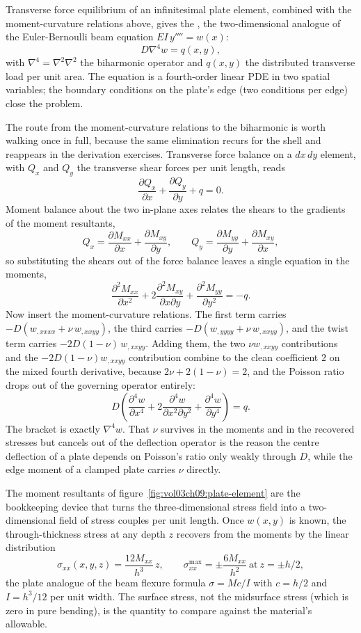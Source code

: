 Transverse force equilibrium of an infinitesimal plate element,
combined with the moment-curvature relations above, gives the
, the two-dimensional analogue of
the Euler-Bernoulli beam equation $EI \,y'''' = w(x)$:
\[
D \nabla^4 w = q(x, y),
\]
with $\nabla^4 = \nabla^2 \nabla^2$ the biharmonic operator and
$q(x, y)$ the distributed transverse load per unit area. The
equation is a fourth-order linear PDE in two spatial variables; the
boundary conditions on the plate's edge (two conditions per edge)
close the problem.

The route from the moment-curvature relations to the biharmonic is
worth walking once in full, because the same elimination recurs for the
shell and reappears in the derivation exercises. Transverse force
balance on a $dx\,dy$ element, with $Q_x$ and $Q_y$ the transverse
shear forces per unit length, reads
\[
\frac{\partial Q_x}{\partial x} + \frac{\partial Q_y}{\partial y}
+ q = 0 .
\]
Moment balance about the two in-plane axes relates the shears to the
gradients of the moment resultants,
\[
Q_x = \frac{\partial M_{xx}}{\partial x}
+ \frac{\partial M_{xy}}{\partial y}, \qquad
Q_y = \frac{\partial M_{yy}}{\partial y}
+ \frac{\partial M_{xy}}{\partial x},
\]
so substituting the shears out of the force balance leaves a single
equation in the moments,
\[
\frac{\partial^2 M_{xx}}{\partial x^2}
+ 2\frac{\partial^2 M_{xy}}{\partial x \partial y}
+ \frac{\partial^2 M_{yy}}{\partial y^2}
= -q .
\]
Now insert the moment-curvature relations. The first term carries
$-D(w_{,xxxx} + \nu\, w_{,xxyy})$, the third carries
$-D(w_{,yyyy} + \nu\, w_{,xxyy})$, and the twist term carries
$-2D(1-\nu)\, w_{,xxyy}$. Adding them, the two $\nu w_{,xxyy}$
contributions and the $-2D(1-\nu) w_{,xxyy}$ contribution combine to
the clean coefficient $2$ on the mixed fourth derivative, because
$2\nu + 2(1-\nu) = 2$, and the Poisson ratio drops out of the
governing operator entirely:
\[
D\left(\frac{\partial^4 w}{\partial x^4}
+ 2\frac{\partial^4 w}{\partial x^2 \partial y^2}
+ \frac{\partial^4 w}{\partial y^4}\right) = q .
\]
The bracket is exactly $\nabla^4 w$. That $\nu$ survives in the
moments and in the recovered stresses but cancels out of the
deflection operator is the reason the centre deflection of a plate
depends on Poisson's ratio only weakly through $D$, while the edge
moment of a clamped plate carries $\nu$ directly.



The moment resultants of figure~\ref{fig:vol03ch09:plate-element} are
the bookkeeping device that turns the three-dimensional stress field
into a two-dimensional field of stress couples per unit length. Once
$w(x,y)$ is known, the through-thickness stress at any depth $z$
recovers from the moments by the linear distribution
\[
\sigma_{xx}(x,y,z) = \frac{12 M_{xx}}{h^3}\, z, \qquad
\sigma_{xx}^{\max} = \pm \frac{6 M_{xx}}{h^2}\ \text{at}\ z = \pm h/2,
\]
the plate analogue of the beam flexure formula $\sigma = Mc/I$ with
$c = h/2$ and $I = h^3/12$ per unit width. The surface stress, not the
midsurface stress (which is zero in pure bending), is the quantity to
compare against the material's allowable.

